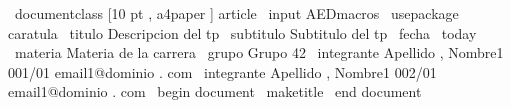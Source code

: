 \ documentclass [10 pt , a4paper ]{ article }
\ input { AEDmacros } %
\ usepackage { caratula } %
\ titulo { Descripcion del tp }
\ subtitulo { Subtitulo del tp }
\ fecha {\ today }
\ materia { Materia de la carrera }
\ grupo { Grupo 42}
\ integrante { Apellido , Nombre1 }{001/01}{ email1@dominio . com }
\ integrante { Apellido , Nombre1 }{002/01}{ email1@dominio . com }
\ begin { document }
\ maketitle
\ end { document }